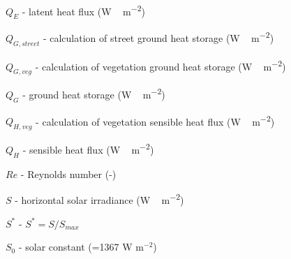 {\begin{description}
\item $Q_{E}$  -   latent heat flux (\unit{W\,m^{-2}})
\item $Q_{G,street}$  -   calculation of street ground heat storage (\unit{W\,m^{-2}}) 
\item $Q_{G,veg}$  -   calculation of vegetation ground heat storage (\unit{W\,m^{-2}}) 
\item $Q_{G}$  -   ground heat storage (\unit{W\,m^{-2}}) 
\item $Q_{H,veg}$  -     calculation of vegetation sensible heat flux (\unit{W\,m^{-2}}) 
\item $Q_{H}$  -     sensible heat flux (\unit{W\,m^{-2}}) 
\item $Re$  -  Reynolds number (-) 
\item $S$  -  horizontal solar irradiance (\unit{W\,m^{-2}})  
\item $S^{*}$  -  $S^{*} = S/S_{max}$ 
\item $S_{0}$  -  solar constant (=1367 W m$^{-2}$) 

\end{description}}
